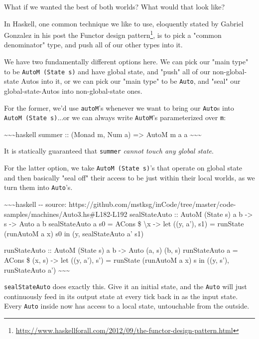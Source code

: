 \documentclass[]{article}
\renewcommand{\href}[2]{#2\footnote{\url{#1}}}
\begin{document}
What if we wanted the best of both worlds? What would that look like?

In Haskell, one common technique we like to use, eloquently stated by Gabriel
Gonzalez in his post
\href{http://www.haskellforall.com/2012/09/the-functor-design-pattern.html}{the
Functor design pattern}, is to pick a "common denominator" type, and push all of
our other types into it.

We have two fundamentally different options here. We can pick our "main type" to
be \texttt{AutoM\ (State\ s)} and have global state, and "push" all of our
non-global-state Autos into it, or we can pick our "main type" to be
\texttt{Auto}, and "seal" our global-state-Autos into non-global-state ones.

For the former, we'd use \texttt{autoM}'s whenever we want to bring our
\texttt{Auto}s into \texttt{AutoM\ (State\ s)}...or we can always write
\texttt{AutoM}'s parameterized over \texttt{m}:

\textasciitilde{}\textasciitilde{}\textasciitilde{}haskell summer :: (Monad m,
Num a) =\textgreater{} AutoM m a a
\textasciitilde{}\textasciitilde{}\textasciitilde{}

It is statically guaranteed that \texttt{summer} \emph{cannot touch any global
state}.

For the latter option, we take \texttt{AutoM\ (State\ s)}'s that operate on
global state and then basically "seal off" their access to be just within their
local worlds, as we turn them into \texttt{Auto}'s.

\textasciitilde{}\textasciitilde{}\textasciitilde{}haskell -\/- source:
https://github.com/mstksg/inCode/tree/master/code-samples/machines/Auto3.hs\#L182-L192
sealStateAuto :: AutoM (State s) a b -\textgreater{} s -\textgreater{} Auto a b
sealStateAuto a s0 = ACons \$ \textbackslash{}x -\textgreater{} let ((y, a'),
s1) = runState (runAutoM a x) s0 in (y, sealStateAuto a' s1)

runStateAuto :: AutoM (State s) a b -\textgreater{} Auto (a, s) (b, s)
runStateAuto a = ACons \$ (x, s) -\textgreater{} let ((y, a'), s') = runState
(runAutoM a x) s in ((y, s'), runStateAuto a')
\textasciitilde{}\textasciitilde{}\textasciitilde{}

\texttt{sealStateAuto} does exactly this. Give it an initial state, and the
\texttt{Auto} will just continuously feed in its output state at every tick back
in as the input state. Every \texttt{Auto} inside now has access to a local
state, untouchable from the outside.
\end{document}
